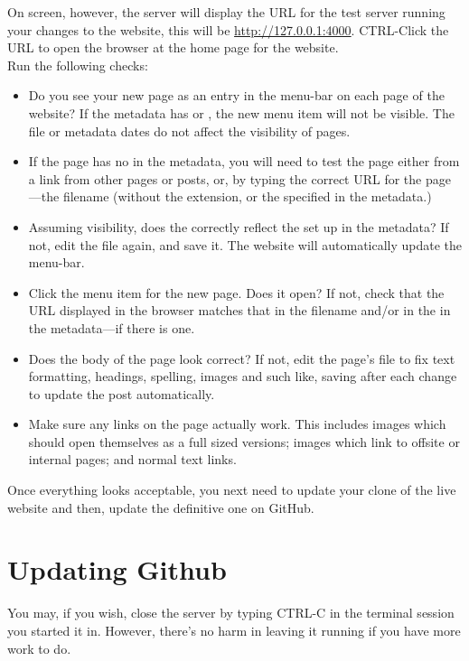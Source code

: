 On screen, however, the server will display the URL for the test server running your changes to the website, this will be \url{http://127.0.0.1:4000}. CTRL-Click the URL to open the browser at the home page for the website.\\

Run the following checks:

\begin{itemize}
    \item Do you see your new page as an entry in the menu-bar on each page of the website?  If the metadata has  or , the new menu item will not be visible. The file or metadata dates do not affect the visibility of pages.
    \item If the page has no  in the metadata, you will need to test the page either from a link from other pages or posts, or, by typing the correct URL for the page---the filename (without the  extension, or the  specified in the metadata.)
    \item Assuming  visibility, does the  correctly reflect the  set up in the metadata? If not, edit the file again, and save it. The website will automatically update the menu-bar.
    \item Click the menu item for the new page. Does it open? If not, check that the URL displayed in the browser matches that in the filename and/or in the  in the metadata---if there is one.
    \item Does the body of the page look correct? If not, edit the page's file to fix text formatting, headings, spelling, images and such like, saving after each change to update the post automatically.
    \item Make sure any links on the page actually work. This includes images which should open themselves as a full sized versions; images which link to offsite or internal pages; and normal text links.
\end{itemize}

Once everything looks acceptable, you next need to update your clone of the live website and then, update the definitive one on GitHub.

\section{Updating Github}\label{sect: Updating Github}

You may, if you wish, close the server by typing CTRL-C in the terminal session you started it in. However, there's no harm in leaving it running if you have more work to do.

